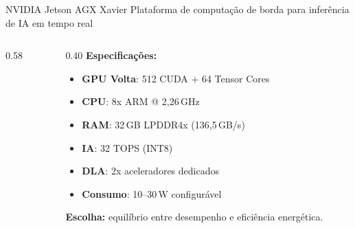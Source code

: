 \begin{frame}{NVIDIA Jetson AGX Xavier}
  \vspace{-2mm}
  {\small\color{sublabelcolor}%
    Plataforma de computação de borda para inferência de IA em tempo real}

  \vspace{2mm}
  \begin{columns}[T]
    \begin{column}{0.58\textwidth}
      \begin{center}
        \resizebox{\textwidth}{!}{}
      \end{center}
    \end{column}
    \begin{column}{0.40\textwidth}
      \vspace{2mm}
      {\small\color{labelcolor}\textbf{Especificações:}}

      \vspace{1mm}
      {\scriptsize
      \begin{itemize}
        \setlength{\itemsep}{1pt}
        \item \textbf{GPU Volta}: 512 CUDA + 64 Tensor Cores
        \item \textbf{CPU}: 8x ARM @ 2,26\,GHz
        \item \textbf{RAM}: 32\,GB LPDDR4x (136,5\,GB/s)
        \item \textbf{IA}: 32 TOPS (INT8)
        \item \textbf{DLA}: 2x aceleradores dedicados
        \item \textbf{Consumo}: 10--30\,W configurável
      \end{itemize}
      }

      \vspace{1mm}
      {\scriptsize\color{stagecolor}\textbf{Escolha:} equilíbrio entre desempenho e eficiência energética.}
    \end{column}
  \end{columns}
\end{frame}

